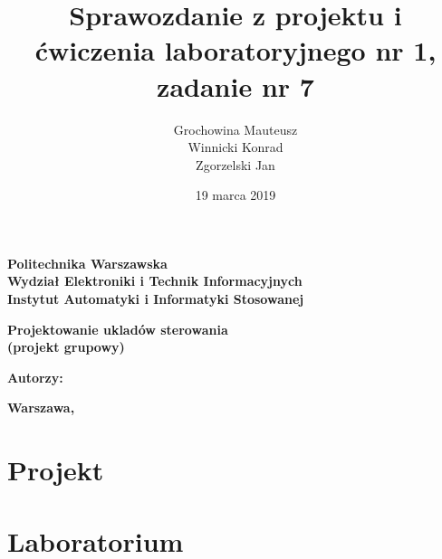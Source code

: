 \documentclass[a4paper,titlepage,11pt,twosides,floatssmall]{mwrep}
\begin{document}
\frenchspacing
\pagestyle{uheadings}

\title{\bf Sprawozdanie z projektu i ćwiczenia laboratoryjnego nr 1, zadanie nr 7\vskip 0.1cm}
\author{Grochowina Mauteusz\\Winnicki Konrad\\Zgorzelski Jan}
\date{19 marca 2019}

\makeatletter
\renewcommand{\maketitle}{\begin{titlepage}
\begin{center}
{\LARGE {\bf Politechnika Warszawska}}\\
\vspace{0.4cm}
{\LARGE {\bf Wydział Elektroniki i Technik Informacyjnych}}\\
\vspace{0.2cm}
{\LARGE {\bf Instytut Automatyki i Informatyki Stosowanej}}\\
\end{center}
\vspace{5cm}
\begin{center}
{\bf \LARGE Projektowanie ukladów sterowania\\ (projekt grupowy) \vskip 0.1cm}
\end{center}
\vspace{1cm}
\begin{center}
{\bf \LARGE \@title}
\end{center}
\vspace{7cm}
{\bf Autorzy:\\ \Large \@author \par}
\vspace*{\stretch{6}}
\begin{center}
\bf{\large{Warszawa, \@date\vskip 0.1cm}}
\end{center}
\end{titlepage}
}
\makeatother

\maketitle

\tableofcontents
\chapter{Projekt}







\chapter{Laboratorium}





\end{document}
